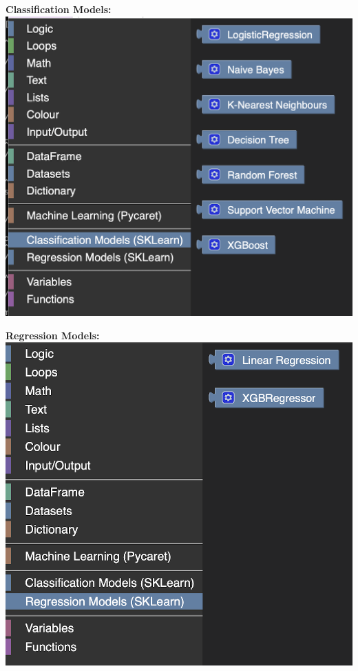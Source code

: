 \documentclass[a0paper,portrait]{article}
\begin{document}
\begin{multicols}{2}
\begin{minipage}{0.48\linewidth}
\textbf{Classification Models:}
\includegraphics[width=\linewidth]{sklearn库中的分类模型.png}
\end{minipage}
\hfill
\begin{minipage}{0.48\linewidth}
\textbf{Regression Models:}
\includegraphics[width=\linewidth]{sklearn库中的回归模型.png}
\end{minipage}


\end{multicols}
\end{document}
